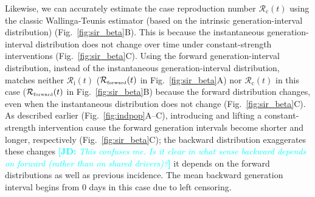\documentclass[12pt]{article}
\newcommand{\comment}{\showcomment}
\newcommand{\showcomment}[3]{\textcolor{#1}{\textbf{[#2: }\textsl{#3}\textbf{]}}}
\newcommand{\jd}[1]{\comment{cyan}{JD}{#1}}
\newcommand{\fref}[1]{Fig.~\ref{fig:#1}}
\newcommand{\Rx}[1]{\ensuremath{{\mathcal R}_{#1}}\xspace}
\newcommand{\Rc}{\Rx{\mathrm{c}}}
\newcommand{\Ri}{\Rx{\mathrm{i}}}
\newcommand{\RR}{\ensuremath{{\mathcal R}}\xspace}
\newcommand{\tsub}[2]{#1_{{\textrm{\tiny #2}}}}
\begin{document}
Likewise, we can accurately estimate the case reproduction number $\Rc(t)$ using the classic Wallinga-Teunis estimator (based on the intrinsic generation-interval distribution) (\fref{sir_beta}B).
This is because the instantaneous generation-interval distribution does not change over time under constant-strength interventions (\fref{sir_beta}C).
Using the forward generation-interval distribution, instead of the instantaneous generation-interval distribution, matches neither $\Ri(t)$ ($\tsub{\RR}{forward}(t)$ in \fref{sir_beta}A) nor $\Rc(t)$ in this case ($\tsub{\RR}{forward}(t)$ in \fref{sir_beta}B) because the forward distribution changes, even when the instantaneous distribution does not change (\fref{sir_beta}C).
As described earlier (\fref{indpop}A--C), introducing and lifting a constant-strength intervention cause the forward generation intervals become shorter and longer, respectively (\fref{sir_beta}C);
the backward distribution exaggerates these changes \jd{This confuses me. Is it clear in what sense backward depends on forward (rather than on shared drivers)?} it depends on the forward distributions as well as previous incidence.
The mean backward generation interval begins from 0 days in this case due to left censoring.
\end{document}
